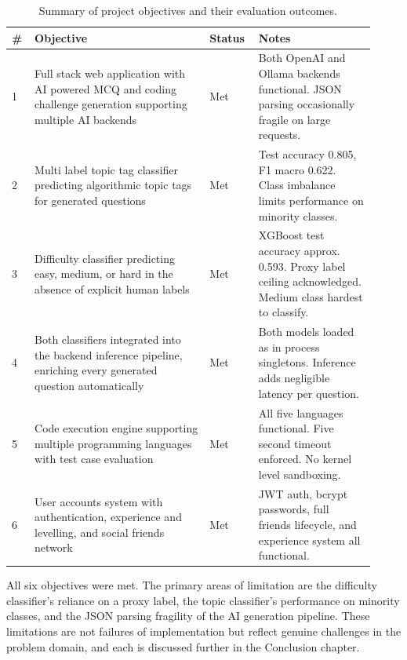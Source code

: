 \begin{table}[H]
    \centering
    \renewcommand{\arraystretch}{1.4}
    \begin{tabular}{p{0.05\linewidth} p{0.45\linewidth} p{0.12\linewidth}
        p{0.30\linewidth}}
        \hline
        \textbf{\#} & \textbf{Objective} & \textbf{Status} &
        \textbf{Notes} \\
        \hline
        1 & Full stack web application with AI powered MCQ and coding
            challenge generation supporting multiple AI backends
          & Met
          & Both OpenAI and Ollama backends functional. JSON parsing
            occasionally fragile on large requests. \\
        2 & Multi label topic tag classifier predicting algorithmic
            topic tags for generated questions
          & Met
          & Test accuracy 0.805, F1 macro 0.622. Class imbalance limits
            performance on minority classes. \\
        3 & Difficulty classifier predicting easy, medium, or hard in
            the absence of explicit human labels
          & Met
          & XGBoost test accuracy approx. 0.593. Proxy label ceiling
            acknowledged. Medium class hardest to classify. \\
        4 & Both classifiers integrated into the backend inference
            pipeline, enriching every generated question automatically
          & Met
          & Both models loaded as in process singletons. Inference
            adds negligible latency per question. \\
        5 & Code execution engine supporting multiple programming
            languages with test case evaluation
          & Met
          & All five languages functional. Five second timeout
            enforced. No kernel level sandboxing. \\
        6 & User accounts system with authentication, experience and
            levelling, and social friends network
          & Met
          & JWT auth, bcrypt passwords, full friends lifecycle, and
            experience system all functional. \\
        \hline
    \end{tabular}
    \caption{Summary of project objectives and their evaluation
    outcomes.}
    \label{table:objectives-summary}
\end{table}

All six objectives were met. The primary areas of limitation are the
difficulty classifier's reliance on a proxy label, the topic
classifier's performance on minority classes, and the JSON parsing
fragility of the AI generation pipeline. These limitations are not
failures of implementation but reflect genuine challenges in the
problem domain, and each is discussed further in the Conclusion
chapter.